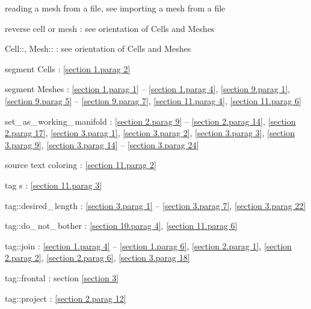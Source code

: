 \documentclass[a4paper]{scrreprt}
\def\numb{}
\newcommand\verm[1]{\textcolor{manif}{#1}}
\renewcommand\tt{\normalfont\ttfamily}
\begin{document}
\noindent
reading a mesh from a file, see importing a mesh from a file

\noindent
reverse cell or mesh : see orientation of {\small\tt \verm{Cell}}s and {\small\tt \verm{Mesh}}es

\noindent
{\small\tt\verm{Cell}::}, {\small\tt\verm{Mesh}::} :
see orientation of {\small\tt \verm{Cell}}s and {\small\tt \verm{Mesh}}es

\noindent
segment {\small\tt \verm{Cell}}s : \ref{\numb section 1.\numb parag 2}

\noindent
segment {\small\tt \verm{Mesh}}es :
\ref{\numb section 1.\numb parag 1} -- \ref{\numb section 1.\numb parag 4},
\ref{\numb section 9.\numb parag 1}, \ref{\numb section 9.\numb parag 5} --
\ref{\numb section 9.\numb parag 7}, \ref{\numb section 11.\numb parag 4},
\ref{\numb section 11.\numb parag 6}

\noindent
{\small\tt set\_\,as\_\,working\_\,manifold} :
\ref{\numb section 2.\numb parag 9} -- \ref{\numb section 2.\numb parag 14},
\ref{\numb section 2.\numb parag 17}, \ref{\numb section 3.\numb parag 1},
\ref{\numb section 3.\numb parag 2}, \ref{\numb section 3.\numb parag 3},
\ref{\numb section 3.\numb parag 9},
\ref{\numb section 3.\numb parag 14} -- \ref{\numb section 3.\numb parag 24}

\noindent
source text coloring : \ref{\numb section 11.\numb parag 2}

\noindent
{\small\tt\textcolor{tag}{tag}}\hskip0.5pt s : \ref{\numb section 11.\numb parag 3}
  
\noindent
{\small\tt\textcolor{tag}{tag}::desired\_\,length} :
\ref{\numb section 3.\numb parag 1} -- \ref{\numb section 3.\numb parag 7},
\ref{\numb section 3.\numb parag 22}

\noindent
{\small\tt\textcolor{tag}{tag}::do\_\,not\_\,bother} :
\ref{\numb section 10.\numb parag 4}, \ref{\numb section 11.\numb parag 6}

\noindent
{\small\tt\textcolor{tag}{tag}::join} :
\ref{\numb section 1.\numb parag 4} -- \ref{\numb section 1.\numb parag 6},
\ref{\numb section 2.\numb parag 1}, \ref{\numb section 2.\numb parag 2},
\ref{\numb section 2.\numb parag 6}, \ref{\numb section 3.\numb parag 18}

\noindent
{\small\tt\textcolor{tag}{tag}::frontal} : section \ref{\numb section 3}
  
\noindent
{\small\tt\textcolor{tag}{tag}::project} : \ref{\numb section 2.\numb parag 12}
  
\end{document}
